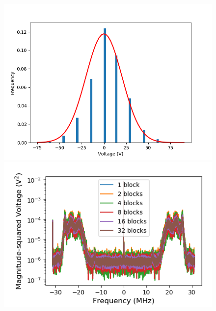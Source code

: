 \documentclass[a4paper]{article}
\begin{document}
\begin{figure}
\centering
\begin{minipage}{.5\textwidth}
	\centering
	\includegraphics[width=.9\linewidth]{5-7/histo}
	\caption{}
	\label{fig:histogram}
\end{minipage}%
\begin{minipage}{.5\textwidth}
	\centering
	\includegraphics[width=.9\linewidth]{5-7/comparison}
	\caption{}
	\label{fig:avgs_comparison}
\end{minipage}
\end{figure}
\end{document}
